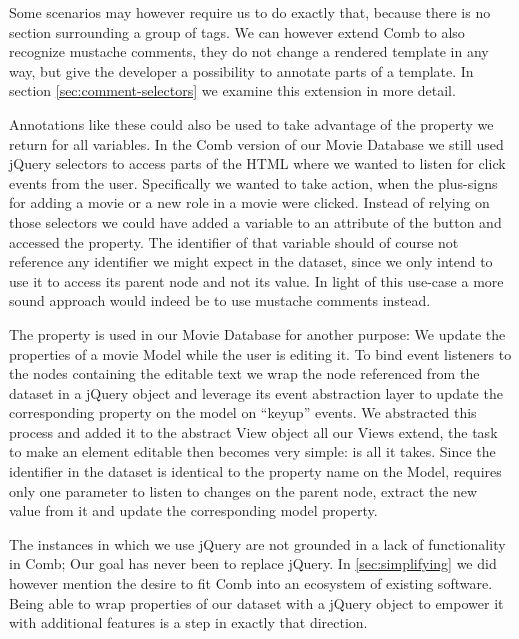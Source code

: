 \documentclass[thesis.tex]{subfiles}
\begin{document}
Some scenarios may however require us to do exactly that, because there is no
section surrounding a group of tags. We can however extend Comb to also
recognize mustache comments, they do not change a rendered template in any way,
but give the developer a possibility to annotate parts of a template. In section
\ref{sec:comment-selectors} we examine this extension in more detail.

Annotations like these could also be used to take advantage of the
 property we return for all variables. In the Comb version
of our Movie Database we still used jQuery selectors to access parts of the HTML
where we wanted to listen for click events from the user. Specifically we wanted
to take action, when the plus-signs for adding a movie or a new role in a movie
were clicked.
Instead of relying on those selectors we could have added a variable to an
attribute of the button and accessed the  property.
The identifier of that variable should of course not reference any identifier we
might expect in the dataset, since we only intend to use it to access its parent
node and not its value.
In light of this use-case a more sound approach would indeed be to use mustache
comments instead.

The  property is used in our Movie Database for another
purpose: We update the properties of a movie Model while the user is editing it.
To bind event listeners to the nodes containing the editable text we wrap the
node referenced from the dataset in a jQuery object and leverage its event
abstraction layer to update the corresponding property on the model on ``keyup''
events. We abstracted this process and added it to the abstract View object
all our Views extend, the task to make an element editable then becomes very
simple:  is all it takes. Since the identifier in the
dataset is identical to the property name on the Model, 
requires only one parameter to listen to changes on the parent node, extract the
new value from it and update the corresponding model property.

The instances in which we use jQuery are not grounded in a lack of functionality
in Comb; Our goal has never been to replace jQuery.
In \ref{sec:simplifying} we did however mention the desire to fit Comb into an
ecosystem of existing software. Being able to wrap properties of our dataset
with a jQuery object to empower it with additional features is a step in exactly
that direction.
\end{document}
